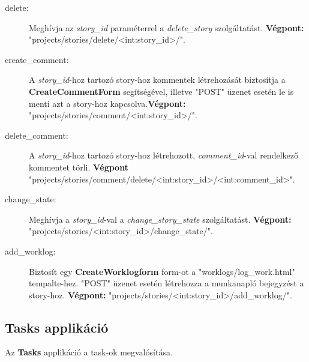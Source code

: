\begin{itemize}
\begin{description}
		\item[delete:] Meghívja az \textit{story\_id} paraméterrel a \textit{delete\_story} szolgáltatást. \textbf{Végpont:} "projects/stories/delete/<int:story\_id>/".
		\item[create\_comment:] A \textit{story\_id}-hoz tartozó story-hoz kommentek létrehozását biztosítja a \textbf{CreateCommentForm} segítségével, illetve "POST" üzenet esetén le is menti azt a story-hoz kapcsolva.\textbf{Végpont:} "projects/stories/comment/<int:story\_id>/".
		\item[delete\_comment:] A \textit{story\_id}-hoz tartozó story-hoz létrehozott, \textit{comment\_id}-val rendelkező kommentet törli. \textbf{Végpont} "projects/stories/comment/delete/<int:story\_id>/<int:comment\_id>".
		\item[change\_state:] Meghívja a \textit{story\_id}-val a \textit{change\_story\_state} szolgáltatást. \textbf{Végpont:} "projects/stories/<int:story\_id>/change\_state/".
		\item[add\_worklog:] Biztosít egy \textbf{CreateWorklogform} form-ot a "worklogs/log\_work.html" tempalte-hez. "POST" üzenet esetén létrehozza a munkanapló bejegyzést a story-hoz. \textbf{Végpont:} "projects/stories/<int:story\_id>/add\_worklog/".
	\end{description}
\end{itemize}	

\subsection{Tasks applikáció}

Az \textbf{Tasks} applikáció a task-ok megvalósítása. 

